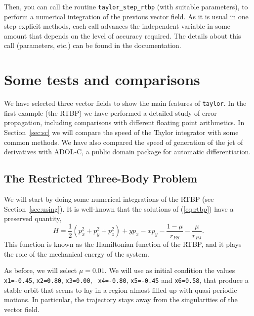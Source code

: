 \documentclass[12pt,twoside]{article}
\begin{document}
Then, you can call the routine \verb-taylor_step_rtbp- (with suitable
parameters), to perform a numerical integration of the previous vector
field. As it is usual in one step explicit methods, each call advances
the independent variable in some amount that depends on the level of
accuracy required. The details about this call (parameters, etc.) can
be found in the documentation.


\section{Some tests and comparisons}\label{sec:tests}
We have selected three vector fields to show the main features of
\texttt{taylor}. In the first example (the RTBP) we have performed a
detailed study of error propagation, including comparisons with
different floating point arithmetics. In Section~\ref{sec:sc} we will
compare the speed of the Taylor integrator with some common
methods. We have also compared the speed of generation of the jet of
derivatives with ADOL-C, a public domain package for automatic
differentiation.

\subsection{The Restricted Three-Body Problem}
We will start by doing some numerical integrations of the RTBP (see
Section~\ref{sec:using}). It is well-known that the solutions of
(\ref{eq:rtbp}) have a preserved quantity,
\[
H=\frac{1}{2}(p_x^2+p_y^2+p_z^2)+yp_x-xp_y
        -\frac{1-\mu}{r_{PS}}-\frac{\mu}{r_{PJ}}.
\]
This function is known as the Hamiltonian function of the RTBP, and it
plays the role of the mechanical energy of the system.

As before, we will select $\mu=0.01$. We will use as initial condition
the values {\tt x1=-0.45}, {\tt x2=0.80}, {\tt x3=0.00}, {\tt
x4=-0.80}, {\tt x5=-0.45} and {\tt x6=0.58}, that produce a stable
orbit that seems to lay in a region almost filled up with
quasi-periodic motions. In particular, the trajectory stays away from
the singularities of the vector field.
\end{document}
